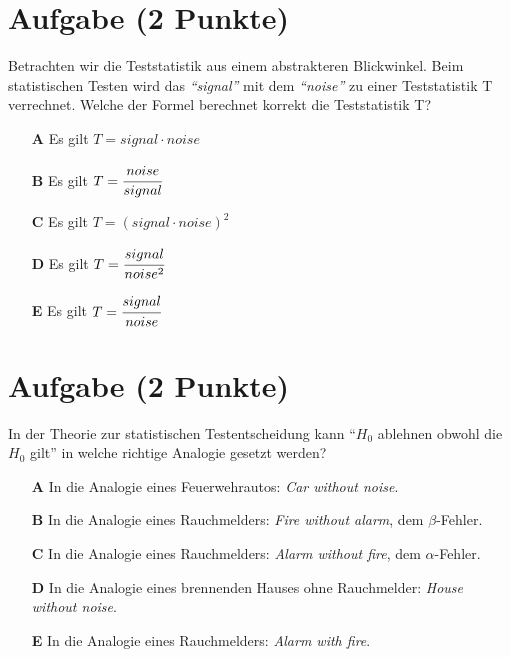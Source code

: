 \documentclass[a4paper, 9pt]{scrartcl}\usepackage[]{graphicx}\usepackage[]{xcolor}
\begin{document}
\section{Aufgabe \hfill (2 Punkte)}

Betrachten wir die Teststatistik aus einem abstrakteren Blickwinkel. Beim
statistischen Testen wird das \textit{"`signal"'} mit dem
\textit{"`noise"'} zu einer Teststatistik T verrechnet. Welche der Formel
berechnet korrekt die Teststatistik T?



\begin{enumerate}
\item [\textbf{A} \msquare] Es gilt $T = signal \cdot noise$
\item [\textbf{B} \msquare] Es gilt $T = \cfrac{noise}{signal}$
\item [\textbf{C} \msquare] Es gilt $T = (signal \cdot noise)^2$
\item [\textbf{D} \msquare] Es gilt $T = \cfrac{signal}{noise^2}$
\item [\textbf{E} \msquare] Es gilt $T = \cfrac{signal}{noise}$
\end{enumerate}


\section{Aufgabe \hfill (2 Punkte)}



In der Theorie zur statistischen Testentscheidung kann "`$H_0$ ablehnen obwohl die $H_0$ gilt"'
in welche richtige Analogie gesetzt werden?



\begin{enumerate}
\item [\textbf{A} \msquare] In die Analogie eines Feuerwehrautos: \textit{Car without noise}.
\item [\textbf{B} \msquare] In die Analogie eines Rauchmelders: \textit{Fire without alarm}, dem $\beta$-Fehler.
\item [\textbf{C} \msquare] In die Analogie eines Rauchmelders: \textit{Alarm without fire}, dem $\alpha$-Fehler.
\item [\textbf{D} \msquare] In die Analogie eines brennenden Hauses ohne Rauchmelder: \textit{House without noise}.
\item [\textbf{E} \msquare] In die Analogie eines Rauchmelders: \textit{Alarm with fire}.
\end{enumerate}
\end{document}
